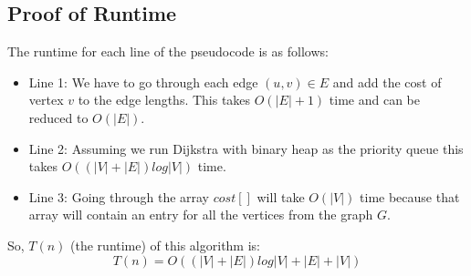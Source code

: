 \documentclass[12pt]{article}
\begin{document}
\subsection*{Proof of Runtime}
The runtime for each line of the pseudocode is as follows:\\
\begin{itemize}
\item Line 1: We have to go through each edge $(u,v) \in E$ and add the cost of vertex $v$ to the edge lengths.  This takes $O(|E| + 1)$ time and can be reduced to $O(|E|)$.
\item Line 2: Assuming we run Dijkstra with binary heap as the priority queue this takes $O((|V|+|E|)log|V|)$ time.
\item Line 3: Going through the array $cost[]$ will take $O(|V|)$ time because that array will contain an entry for all the vertices from the graph $G$.
\end{itemize}
So, $T(n)$ (the runtime) of this algorithm is:\\
$$
T(n) = O((|V|+|E|)log|V| + |E| + |V|)
$$
\end{document}

